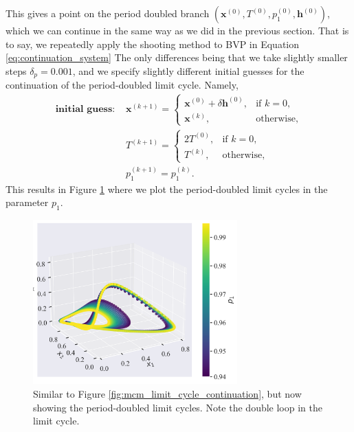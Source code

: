 This gives a point on the period doubled branch $(\mathbf{x}^{(0)}, T^{(0)}, p_1^{(0)}, \mathbf{h}^{(0)})$, 
which we can continue in the same way as we did in the previous section.
That is to say, we repeatedly apply the shooting method to BVP in Equation \ref{eq:continuation_system} 
The only differences being that we take slightly smaller steps $\delta_p = 0.001$, and 
we specify slightly different initial guesses for the continuation of the period-doubled limit cycle. Namely,
\begin{align*}
    \textbf{initial guess: }&\mathbf{x}^{(k+1)} = 
    \begin{cases}
        \mathbf{x}^{(0)} + \delta \mathbf{h}^{(0)}, & \text{if } k = 0, \\
        \mathbf{x}^{(k)}, & \text{otherwise},
    \end{cases} \\
    &T^{(k+1)} = 
    \begin{cases}
        2 T^{(0)}, & \text{if } k = 0, \\
        T^{(k)}, & \text{otherwise}, 
    \end{cases}\\
    &p_1^{(k+1)} = p_1^{(k)}.
\end{align*}
This results in Figure \ref{fig:mcm_period_doubled_branch} where we plot the period-doubled limit cycles in the parameter $p_1$.
\begin{figure}
    \centering
    \includegraphics[width=0.7\textwidth]{figures/mcm_first_pdouble.png}
    \caption{Similar to Figure \ref{fig:mcm_limit_cycle_continuation}, but now showing the period-doubled limit cycles. Note the double loop 
    in the limit cycle.}
    \label{fig:mcm_period_doubled_branch}
\end{figure}

